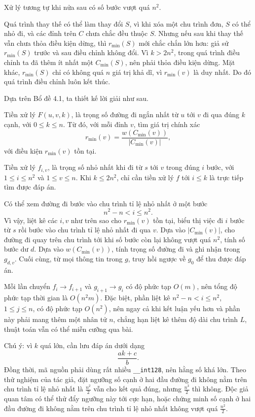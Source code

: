 \documentclass[11pt]{article}
\begin{document}
Xử lý tương tự khi nửa sau có số bước vượt quá \(n^2\).

Quá trình thay thế có thể làm thay đổi \(S\), vì khi xóa một chu trình đơn,
\(S\) có thể nhỏ đi, và các đỉnh trên \(C\) chưa chắc đều thuộc \(S\). Nhưng
nếu sau khi thay thế vẫn chưa thỏa điều kiện dừng, thì \(r_{\min}(S)\) mới
chắc chắn lớn hơn: giả sử \(r_{\min}(S)\) trước và sau điều chỉnh không đổi.
Vì \(k>2n^2\), trong quá trình điều chỉnh ta đã thêm ít nhất một
\(C_{\min}(S)\), nên phải thỏa điều kiện dừng. Mặt khác, \(r_{\min}(S)\) chỉ
có không quá \(n\) giá trị khả dĩ, vì \(r_{\min}(v)\) là duy nhất. Do đó quá
trình điều chỉnh luôn kết thúc.

Dựa trên Bổ đề 4.1, ta thiết kế lời giải như sau.

Tiền xử lý \(F(u,v,k)\), là trọng số đường đi ngắn nhất từ \(u\) tới \(v\) đi
qua đúng \(k\) cạnh, với \(0\le k\le n\). Từ đó, với mỗi đỉnh \(v\), tìm giá
trị chính xác
\[
  r_{\min}(v)=\frac{w(C_{\min}(v))}{|C_{\min}(v)|},
\]
với điều kiện \(r_{\min}(v)\) tồn tại.

Tiền xử lý \(f_{i,v}\), là trọng số nhỏ nhất khi đi từ \(s\) tới \(v\) trong
đúng \(i\) bước, với \(1\le i\le n^2\) và \(1\le v\le n\). Khi \(k\le2n^2\),
chỉ cần tiền xử lý \(f\) tới \(i\le k\) là trực tiếp tìm được đáp án.

Có thể xem đường đi bước vào chu trình tỉ lệ nhỏ nhất ở một bước
\[
  n^2-n<i\le n^2.
\]
Vì vậy, liệt kê các \(i,v\) như trên sao cho \(r_{\min}(v)\) tồn tại, biểu
thị việc đi \(i\) bước từ \(s\) rồi bước vào chu trình tỉ lệ nhỏ nhất đi qua
\(v\). Dựa vào \(|C_{\min}(v)|\), cho đường đi quay trên chu trình tới khi số
bước còn lại không vượt quá \(n^2\), tính số bước dư \(d\). Dựa vào
\(w(C_{\min}(v))\), tính trọng số đường đi và ghi nhận trong \(g_{d,v}\). Cuối
cùng, từ mọi thông tin trong \(g\), truy hồi ngược về \(g_0\) để thu được đáp
án.

Mỗi lần chuyển \(f_i\to f_{i+1}\) và \(g_{i+1}\to g_i\) có độ phức tạp
\(O(m)\), nên tổng độ phức tạp thời gian là \(O(n^2m)\). Đặc biệt, phần liệt kê
\(n^2-n<i\le n^2\), \(1\le j\le n\), có độ phức tạp \(O(n^2)\), nên ngay cả khi
kết luận yếu hơn và phần này phải mang thêm một nhân tử \(n\), chẳng hạn liệt
kê thêm độ dài chu trình \(L\), thuật toán vẫn có thể miễn cưỡng qua bài.

Chú ý: vì \(k\) quá lớn, cần lưu đáp án dưới dạng
\[
  \frac{ak+c}{b}.
\]
Đồng thời, mã nguồn phải dùng rất nhiều \texttt{\_\_int128}, nên hằng số khá
lớn. Theo thử nghiệm của tác giả, đặt ngưỡng số cạnh ở hai đầu đường đi không
nằm trên chu trình tỉ lệ nhỏ nhất là \(\frac{n^2}{2}\) vẫn cho kết quả đúng,
nhưng \(\frac{n^3}{2}\) thì không. Độc giả quan tâm có thể thử đẩy ngưỡng này
tới cực hạn, hoặc chứng minh số cạnh ở hai đầu đường đi không nằm trên chu
trình tỉ lệ nhỏ nhất không vượt quá \(\frac{n^2}{2}\).
\end{document}
